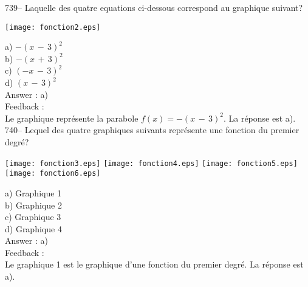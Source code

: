 \documentclass[letterpaper, 12pt]{article}
\begin{document}
739-- Laquelle des quatre equations ci-dessous correspond au graphique
suivant?\\
    \begin{center}
    \texttt{[image: fonction2.eps]}
    \end{center}

a) $-(x\,-\,3)^{2}$\\
b) $-(x\,+\,3)^{2}$\\
c) $(-x\,-\,3)^{2}$\\
d) $(x\,-\,3)^{2}$\\

Answer : a)\\

Feedback : \\
Le graphique repr\'esente la parabole $f(x)=-(x\,-\,3)^{2}$.  La r\'eponse
est a).  \\

740-- Lequel des quatre graphiques suivants repr\'esente une fonction du
premier degr\'e?\\
    \begin{center}
    \texttt{[image: fonction3.eps]}
\texttt{[image: fonction4.eps]}
\texttt{[image: fonction5.eps]}
\texttt{[image: fonction6.eps]}
    \end{center}
a) Graphique 1\\
b) Graphique 2\\
c) Graphique 3\\
d) Graphique 4\\

Answer : a)\\

Feedback : \\
Le graphique 1 est le graphique d'une fonction du premier degr\'e.  La
r\'eponse est a).\\
\end{document}

